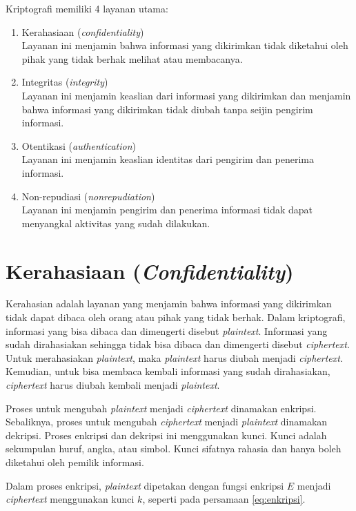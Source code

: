 Kriptografi memiliki 4 layanan utama\cite{forouzan2007cryptography}:
\begin{enumerate}
	\item Kerahasiaan (\textit{confidentiality})\\
	Layanan ini menjamin bahwa informasi yang dikirimkan tidak diketahui oleh pihak yang tidak berhak melihat atau membacanya.
	\item Integritas (\textit{integrity})\\
	Layanan ini menjamin keaslian dari informasi yang dikirimkan dan menjamin bahwa informasi yang dikirimkan tidak diubah tanpa seijin pengirim informasi.
	\item Otentikasi (\textit{authentication})\\
	Layanan ini menjamin keaslian identitas dari pengirim dan penerima informasi.
	\item Non-repudiasi (\textit{nonrepudiation})\\
	Layanan ini menjamin pengirim dan penerima informasi tidak dapat menyangkal aktivitas yang sudah dilakukan.
\end{enumerate}

\section{Kerahasiaan (\textit{Confidentiality})}

Kerahasian adalah layanan yang menjamin bahwa informasi yang dikirimkan tidak dapat dibaca oleh orang atau pihak yang tidak berhak. Dalam kriptografi, informasi yang bisa dibaca dan dimengerti disebut \textit{plaintext}. Informasi yang sudah dirahasiakan sehingga tidak bisa dibaca dan dimengerti disebut \textit{ciphertext}. Untuk merahasiakan \textit{plaintext}, maka \textit{plaintext} harus diubah menjadi \textit{ciphertext}. Kemudian, untuk bisa membaca kembali informasi yang sudah dirahasiakan, \textit{ciphertext} harus diubah kembali menjadi \textit{plaintext}.

Proses untuk mengubah \textit{plaintext} menjadi \textit{ciphertext} dinamakan enkripsi. Sebaliknya, proses untuk mengubah \textit{ciphertext} menjadi \textit{plaintext} dinamakan dekripsi. Proses enkripsi dan dekripsi ini menggunakan kunci. Kunci adalah sekumpulan huruf, angka, atau simbol. Kunci sifatnya rahasia dan hanya boleh diketahui oleh pemilik informasi.

Dalam proses enkripsi, \textit{plaintext} dipetakan dengan fungsi enkripsi \begin{math}E\end{math} menjadi \textit{ciphertext} menggunakan kunci \begin{math}k\end{math}, seperti pada persamaan \ref{eq:enkripsi}.

